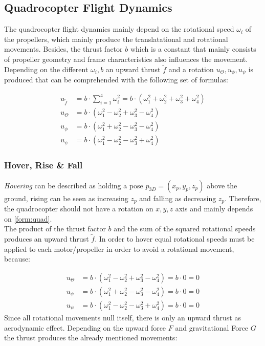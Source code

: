 \newpage 


\subsection{Quadrocopter Flight Dynamics}
The quadrocopter flight dynamics mainly depend on the rotational speed $\omega_i$ of the propellers, which mainly produce the translatational  and rotational movements. Besides, the thrust factor $b$ which is a constant that mainly consists of propeller geometry and frame characteristics also influences the movement. Depending on the different $\omega_i, b$ an upward thrust $\tilde{f}$ and a rotation $u_{\Theta}, u_{\phi}, u_{\psi}$ is produced that can be comprehended with the following set of formulas:

\begin{align}
	u_{\tilde{f}} &= b \cdot \sum_{i=1}^{4}\omega_i^2 = b \cdot ( \omega_1^2 + \omega_2^2 + \omega_3^2 + \omega_4^2)\label{form:quad}\\
	u_{\Theta} &= b \cdot (\omega_1^2 - \omega_2^2 + \omega_3^2 - \omega_4^2) \label{form:quad2}\\
	u_{\phi} &= b \cdot (\omega_1^2 + \omega_2^2 - \omega_3^2 - \omega_4^2)\label{form:quad3}\\
	u_{\psi} &= b \cdot (\omega_1^2 - \omega_2^2 - \omega_3^2 + \omega_4^2)\label{form:quad4}
\end{align}

\subsubsection{Hover, Rise \& Fall} \label{sec:hover}
\emph{Hovering} can be described as holding a pose $p_{3D} = (x_p, y_p, z_p)$ above the ground, rising can be seen as increasing $z_p$ and falling as decreasing $z_p$. Therefore, the quadrocopter should not have a rotation on $x,y,z$ axis and mainly depends on \cref{form:quad}.  \\
The product of the thrust factor $b$ and the sum of the squared rotational speeds produces an upward thrust $\tilde{f}$. In order to hover equal rotational speeds must be applied to each motor/propeller in order to avoid a rotational movement, because:

\begin{align}
	u_{\Theta} &= b \cdot (\omega_1^2 - \omega_2^2 + \omega_3^2 - \omega_4^2) = b \cdot 0 = 0\\
	u_{\phi} &= b \cdot (\omega_1^2 + \omega_2^2 - \omega_3^2 - \omega_4^2) = b \cdot 0 = 0\\
	u_{\psi} &= b \cdot (\omega_1^2 - \omega_2^2 - \omega_3^2 + \omega_4^2)	= b \cdot 0 = 0
\end{align}
Since all rotational movements null itself, there is only an upward thrust as aerodynamic effect.
Depending on the upward force $F$ and gravitational Force $G$ the thrust produces the already mentioned movements:

